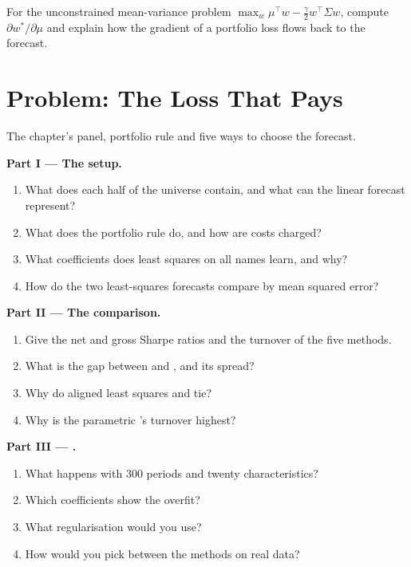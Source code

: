 \begin{exercise}[$\star\star\star$]\label{exo:ml:from-prediction-to-portfolio:8}
For the unconstrained mean-variance problem $\max_w\mu^\top w - \frac\gamma2w^\top\Sigma w$, compute $\partial w^*/\partial\mu$
and explain how the gradient of a portfolio loss flows back to the forecast.
\end{exercise}

\section{Problem: The Loss That Pays}

\begin{problem}\label{pb:ml:from-prediction-to-portfolio:1}
The chapter's panel, portfolio rule and five ways to choose the forecast.

\medskip\noindent\textbf{Part I --- The setup.}
\begin{enumerate}
\item What does each half of the universe contain, and what can the linear forecast represent?
\item What does the portfolio rule do, and how are costs charged?
\item What coefficients does least squares on all names learn, and why?
\item How do the two least-squares forecasts compare by mean squared error?
\end{enumerate}

\medskip\noindent\textbf{Part II --- The comparison.}
\begin{enumerate}[resume]
\item Give the net and gross Sharpe ratios and the turnover of the five methods.
\item What is the gap between  and , and its spread?
\item Why do aligned least squares and  tie?
\item Why is the parametric 's turnover highest?
\end{enumerate}

\medskip\noindent\textbf{Part III --- .}
\begin{enumerate}[resume]
\item What happens with 300 periods and twenty characteristics?
\item Which coefficients show the overfit?
\item What regularisation would you use?
\item How would you pick between the methods on real data?
\end{enumerate}


\end{problem}
